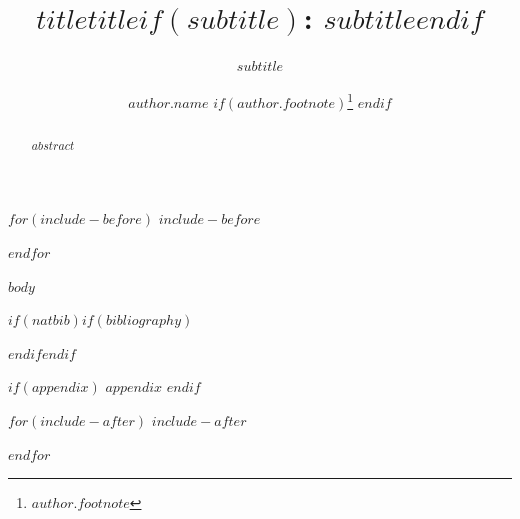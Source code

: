 \documentclass[$format$ ,$hyphenation$ $if(authorcolumns)$ ,authorcolumns $endif$ $if(cleveref)$,cleveref$endif$ $if(autoref)$,autoref$endif$ $if(thm-restate)$,thm-restate$endif$ $if(anonymous)$,anonymous$endif$ $if(numberwithinsect)$,numberwithinsect$endif$ $if(pdfa)$,pdfa$endif$ $if(oldauthorstyle)$,oldauthorstyle$endif$ ]{lipics-v2021}
\title{$title$}
\subtitle{$subtitle$}
\title{$title$$if(subtitle)$: $subtitle$$endif$}
\author{$author.name$ $if(author.footnote)$\footnote{$author.footnote$} $endif$}{$author.affiliation$}{$author.email$}{$author.orcid$}{$if(author.funding)$ $author.funding$ $endif$}
\begin{document}
$for(include-before)$
$include-before$

$endfor$


\maketitle

\begin{abstract}
$abstract$
\end{abstract}

$body$



$if(natbib)$$if(bibliography)$

$endif$$endif$

$if(appendix)$
\appendix
$appendix$
$endif$

$for(include-after)$
$include-after$

$endfor$
\end{document}
